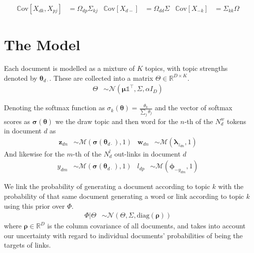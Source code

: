 \documentclass{sciposter}
\newcommand \cov[1] {
    \mathbb{C}\text{ov}[ #1 ]
}
\newcommand \T { ^\top }
\newcommand \vv[1] { \bm #1 }
\newcommand \diag[1] { \text{diag} \left( {#1} \right) }
\newcommand \wdn[0]  { { \vv{w}_{dn} } }
\newcommand \zdn[0]  { { \vv{z}_{dn} } }
\newcommand \mnor[3]  { \mathcal{N} \left(#1, #2, #3\right) }
\newcommand \muln[2]  { \mathcal{M} \left( {#1},{#2} \right) }
\newcommand \VReal[1] { { \mathbb{R}^{#1} } }
\newcommand \MReal[2] { { \mathbb{R}^{#1 \times #2} } }
\newcommand \one  {{  \mathds{1} }}
\newcommand \thdo { { \vv{\theta}_{d\cdot} } }
\begin{document}
\begin{multicols}{3}
\begin{align*}
\cov{X_{dk}, X_{pj}} & = \Omega_{dp} \Sigma_{kj} &
\cov{X_{d-}} & = \Omega_{dd} \Sigma &
\cov{X_{-k}} & = \Sigma_{kk} \Omega 
\end{align*}


\newcommand{\imsize}{0.45\columnwidth}
%


\section{The Model}




Each document is modelled as a mixture of $K$ topics, with topic strengths denoted by $\thdo$. These are collected into a matrix $\Theta \in \MReal{D}{K}$. 
\begin{align*}
\Theta &\sim \mnor{\vv{\mu}\one\T}{\Sigma}{\alpha I_D}
\end{align*}

Denoting the softmax function as $\sigma_k(\vv{\theta}) = \frac{\theta_k}{\sum_j \theta_j}$ and the vector of softmax scores as $\vv{\sigma}(\vv{\theta})$ we 
the draw topic and then word for the $n$-th of the $N^w_d$ tokens in document $d$ as
\begin{align*}
\zdn & \sim \muln{\vv{\sigma}(\thdo)}{1} &
\wdn & \sim \muln{\vv{\lambda}_{z_{dn}}}{1}
\end{align*}
And likewise for the $m$-th of the $N^l_d$ out-links in document $d$
\begin{align*}
y_{dm} & \sim \muln{\vv{\sigma}(\thdo)}{1} &
l_{dp} & \sim \muln{\vv{\phi}_{- y_{dm}}}{1}
\end{align*}

We link the probability of generating a document according to topic $k$ with the probability of that same document generating a word or link according to topic $k$ using this prior over $\Phi$.
\begin{align*}
\Phi|\Theta & \sim \mnor{\Theta}{\Sigma}{\diag{\vv{\rho}}}
\end{align*}
where $\vv{\rho} \in \VReal{D}$ is the column covariance of all documents, and takes into account our uncertainty with regard to individual documents' probabilities of being the targets of links.



\end{multicols}
\end{document}
